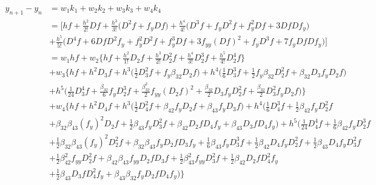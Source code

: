 \documentclass[12 pt]{article}
\begin{document}
\begin{align*}
	y_{n+1} - y_{n} &= w_{1}k_{1} + w_{2}k_{2} + w_{3}k_{3} + w_{4}k_{4}\\
					&= \bigg[hf + \frac{h^{2}}{2!}Df + \frac{h^{3}}{3!}\bigg(D^{2}f+f_{y}Df\bigg)  + \frac{h^{4}}{4!}\bigg(D^{3}f + f_{y}D^{2}f + f_{y}^{2}Df + 3DfDf_{y}\bigg)\\ 
					&+ \frac{h^{5}}{5!}\bigg(D^{4}f+6DfD^{2}f_{y} + f_{y}^{2}D^{2}f + f_{y}^{3}Df + 3f_{yy}(Df)^{2} + f_{y}D^{3}f + 7f_{y}DfDf_{y}\bigg)\bigg]\\
					&= w_{1}hf + w_{2}\bigg\{hf + \frac{h^{2}}{1!}D_{2}f + \frac{h^{3}}{2!}D_{2}^{2}f + \frac{h^{4}}{3!}D_{2}^{3}f + \frac{h^{5}}{4!}D_{2}^{4}f\bigg\}\\ 
					&+ w_{3}\bigg\{hf + h^{2}D_{3}f + h^{3}\bigg(\frac{1}{2}D_{3}^{2}f + f_{y}\beta_{32}D_{2}f\bigg) + h^{4}\bigg(\frac{1}{6}D_{3}^{3}f + \frac{1}{2}f_{y}\beta_{32}D_{2}^{2}f + \beta_{32}D_{3}f_{y}D_{2}f\bigg) \\
					&+ h^{5}\bigg(\frac{1}{24}D^{4}_{3}f + \frac{\beta_{32}}{6}f_{y}D_{2}^{3}f + \frac{\beta_{32}^{2}}{2}f_{yy}(D_{2}f)^{2} + \frac{\beta_{32}}{2}D_{3}f_{y}D_{2}^{2}f + \frac{\beta_{32}}{2}D_{3}^{2}f_{y}D_{2}f\bigg)\bigg\}\\
					&+ w_{4} \bigg\{hf + h^{2}D_{4}f + h^{3}\bigg(\frac{1}{2}D_{4}^{2}f + \beta_{42}f_{y}D_{2}f + \beta_{43}f_{y}D_{3}f\bigg) + h^{4}\bigg(\frac{1}{6}D^{3}_{4}f + \frac{1}{2}\beta_{42}f_{y}D_{2}^{2}f\\
					&+ \beta_{32}\beta_{43}(f_{y})^{2}D_{2}f + \frac{1}{2}\beta_{43}f_{y}D_{3}^{2}f + \beta_{42}D_{2}fD_{4}f_{y}	+ \beta_{43}D_{3}fD_{4}f_{y}\bigg) +  h^{5}\bigg(\frac{1}{24}D_{4}^{4}f + \frac{1}{6}\beta_{42}f_{y}D_{2}^{3}f\\
					&+\frac{1}{2}\beta_{32}\beta_{43}(f_{y})^{2}D_{2}^{2}f + \beta_{32}\beta_{43}f_{y}D_{2}fD_{3}f_{y} + \frac{1}{6}\beta_{43}f_{y}D_{3}^{3}f + \frac{1}{2}\beta_{42}D_{4}f_{y}D_{2}^{2}f + \frac{1}{2}\beta_{43}D_{4}f_{y}D_{3}^{2}f\\
					&+\frac{1}{2}\beta_{42}^{2}f_{yy}D_{2}^{2}f + \beta_{42}\beta_{43}f_{yy}D_{2}fD_{3}f + \frac{1}{2}\beta_{43}^{2}f_{yy}D_{3}^{2}f + \frac{1}{2}\beta_{42}D_{2}fD_{4}^{2}f_{y}\\
					&+ \frac{1}{2}\beta_{43}D_{3}fD_{4}^{2}f_{y} + \beta_{43}\beta_{32}f_{y}D_{2}fD_{4}f_{y}\bigg)\bigg\}				
\end{align*}
\end{document}
